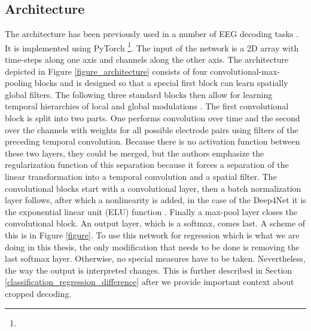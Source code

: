 \subsection{Architecture}\label{subsec:architecture}
The architecture has been previously used in a number of EEG decoding tasks \cite{}.
It is implemented using PyTorch \footnote{}.
The input of the network is a 2D array with time-steps along one axis and channels along the other axis.
The architecture depicted in Figure \ref{figure_architecture} consists of four convolutional-max-pooling blocks and is designed so that a special first block can learn spatially global filters.
The following three standard blocks then allow for learning temporal hierarchies of local and global modulations \cite{Schirrmeister_2017}.
The first convolutional block is split into two parts.
One performs convolution over time and the second over the channels with weights for all possible electrode pairs using filters of the preceding temporal convolution.
Because there is no activation function between these two layers, they could be merged, but the authors emphasize the regularization function of this separation because it forces a separation of the linear transformation into a temporal convolution and a spatial filter.
The convolutional blocks start with a convolutional layer, then a batch normalization layer follows, after which a nonlinearity is added, in the case of the Deep4Net it is the exponential linear unit (ELU) function \cite{}.
Finally a max-pool layer closes the convolutional block.
An output layer, which is a softmax, comes last.
A scheme of this is in Figure \ref{figure}.
To use this network for regression which is what we are doing in this thesis, the only modification that needs to be done is removing the last softmax layer.
Otherwise, no special measures have to be taken.
Nevertheless, the way the output is interpreted changes.
This is further described in Section \ref{classification_regression_difference} after we provide important context about cropped decoding.

